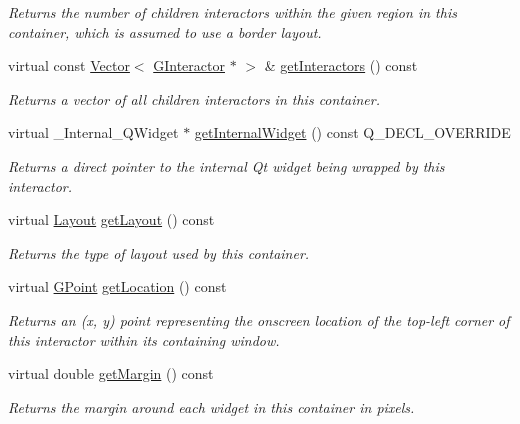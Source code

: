 \begin{DoxyCompactItemize}
\begin{DoxyCompactList}\small\item\em Returns the number of children interactors within the given region in this container, which is assumed to use a border layout. \end{DoxyCompactList}\item 
virtual const \mbox{\hyperlink{classVector}{Vector}}$<$ \mbox{\hyperlink{classGInteractor}{G\+Interactor}} $\ast$ $>$ \& \mbox{\hyperlink{classGContainer_a3f9ba3028f69581c7de79c9c03f39a2e}{get\+Interactors}} () const
\begin{DoxyCompactList}\small\item\em Returns a vector of all children interactors in this container. \end{DoxyCompactList}\item 
virtual \+\_\+\+Internal\+\_\+\+Q\+Widget $\ast$ \mbox{\hyperlink{classGContainer_a208ce13c1da40bf0ddb509daf99d6588}{get\+Internal\+Widget}} () const Q\+\_\+\+D\+E\+C\+L\+\_\+\+O\+V\+E\+R\+R\+I\+DE
\begin{DoxyCompactList}\small\item\em Returns a direct pointer to the internal Qt widget being wrapped by this interactor. \end{DoxyCompactList}\item 
virtual \mbox{\hyperlink{classGContainer_a1b7da28ed84c0763e8f92cde2df4799b}{Layout}} \mbox{\hyperlink{classGContainer_aeebcf77b7fdc91a1ba0371cc9b91d5e2}{get\+Layout}} () const
\begin{DoxyCompactList}\small\item\em Returns the type of layout used by this container. \end{DoxyCompactList}\item 
virtual \mbox{\hyperlink{classGPoint}{G\+Point}} \mbox{\hyperlink{classGInteractor_a4f83802015511edeb63b892830812c11}{get\+Location}} () const
\begin{DoxyCompactList}\small\item\em Returns an (x, y) point representing the onscreen location of the top-\/left corner of this interactor within its containing window. \end{DoxyCompactList}\item 
virtual double \mbox{\hyperlink{classGContainer_ae2b63e249b9251e1893dae87aaf4cc3d}{get\+Margin}} () const
\begin{DoxyCompactList}\small\item\em Returns the margin around each widget in this container in pixels. \end{DoxyCompactList}\item 

\end{DoxyCompactItemize}
